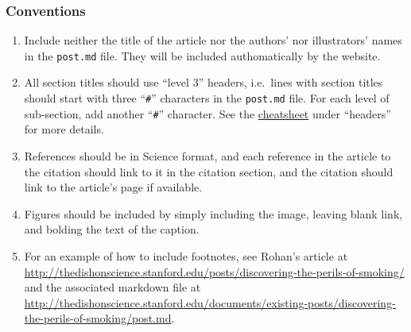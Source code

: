 \documentclass[paper=a4, fontsize=11pt]{scrartcl}
\numberwithin{equation}{section}        %
\numberwithin{figure}{section}            %
\numberwithin{table}{section}                %
\newcommand{\dishurlplain}[1]{http://thedishonscience.stanford.edu/#1}
\begin{document}
\subsubsection{Conventions}\label{sec:conventions}
\begin{enumerate}
    \item Include neither the title of the article nor the authors' nor
        illustrators' names in the \texttt{post.md} file. They will be included
        authomatically by the website.
    \item All section titles should use ``level 3'' headers, i.e.\ lines with section
        titles should start with three ``\texttt{\#}'' characters in the
        \texttt{post.md} file. For each level of sub-section, add another
        ``\texttt{\#}'' character. See the
        \href{https://github.com/adam-p/markdown-here/wiki/Markdown-Cheatsheet}{cheatsheet}
        under ``headers'' for more details.
    \item References should be in Science format, and each reference in the
        article to the citation should link to it in the citation section, and
        the citation should link to the article's page if available.
    \item Figures should be included by simply including the image, leaving
        blank link, and bolding the text of the caption.
    \item For an example of how to include footnotes, see Rohan's article at
        \url{\dishurlplain{posts/discovering-the-perils-of-smoking/}} and the
        associated markdown file at
        \url{\dishurlplain{documents/existing-posts/discovering-the-perils-of-smoking/post.md}}.

\end{enumerate}

\end{document}
